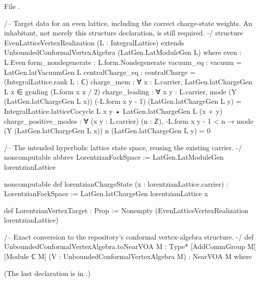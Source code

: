 \noindent File .
\begin{leancode}
/-- Target data for an even lattice, including the correct charge-state weights.
An inhabitant, not merely this structure declaration, is still required. -/
structure EvenLatticeVertexRealization (L : IntegralLattice) extends
    UnboundedConformalVertexAlgebra (LatGen.LatModuleGen L) where
  even : L.Even
  form_nondegenerate : L.form.Nondegenerate
  vacuum_eq : vacuum = LatGen.latVacuumGen L
  centralCharge_eq : centralCharge = (IntegralLattice.rank L : ℂ)
  charge_mem : ∀ x : L.carrier,
    LatGen.latChargeGen L x ∈ grading (L.form x x / 2)
  charge_leading : ∀ x y : L.carrier,
    mode (Y (LatGen.latChargeGen L x)) (-L.form x y - 1) (LatGen.latChargeGen L y) =
      IntegralLattice.latticeCocycle L x y • LatGen.latChargeGen L (x + y)
  charge_positive_modes : ∀ (x y : L.carrier) (n : ℤ), -L.form x y - 1 < n →
    mode (Y (LatGen.latChargeGen L x)) n (LatGen.latChargeGen L y) = 0

/-- The intended hyperbolic lattice state space, reusing the existing carrier. -/
noncomputable abbrev LorentzianFockSpace := LatGen.LatModuleGen lorentzianLattice

noncomputable def lorentzianChargeState (x : lorentzianLattice.carrier) :
    LorentzianFockSpace := LatGen.latChargeGen lorentzianLattice x

def LorentzianVertexTarget : Prop := Nonempty (EvenLatticeVertexRealization lorentzianLattice)

/-- Exact conversion to the repository's conformal vertex-algebra structure. -/
def UnboundedConformalVertexAlgebra.toNearVOA {M : Type*} [AddCommGroup M] [Module ℂ M]
    (V : UnboundedConformalVertexAlgebra M) : NearVOA M where
\end{leancode}
\noindent (The last declaration is in .)

